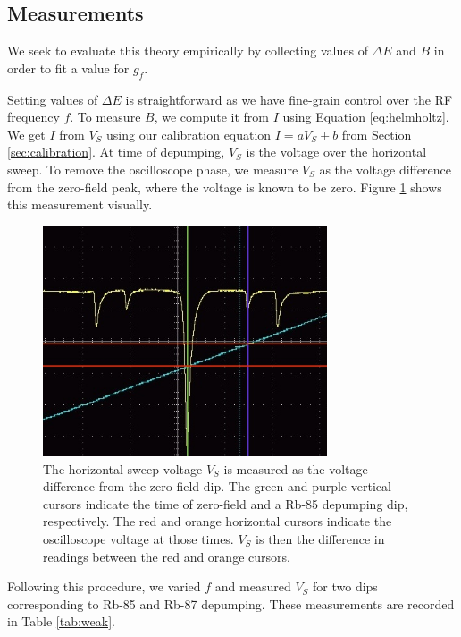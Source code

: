 \documentclass[12pt, letterpaper]{article}
\begin{document}
\subsection{Measurements}

We seek to evaluate this theory empirically by collecting values of $\Delta E$ and $B$ in order to fit a value for $g_f$. 

Setting values of $\Delta E$ is straightforward as we have fine-grain control over the RF frequency $f$. To measure $B$, we compute it from $I$ using Equation \ref{eq:helmholtz}. We get $I$ from $V_S$ using our calibration equation $I = a V_S + b$ from Section \ref{sec:calibration}. At time of depumping, $V_S$ is the voltage over the horizontal sweep. To remove the oscilloscope phase, we measure $V_S$ as the voltage difference from the zero-field peak, where the voltage is known to be zero. Figure \ref{fig:weak-measurement} shows this measurement visually. 

\begin{figure}[!h]
    \centering
    \includegraphics[width=0.75\textwidth]{experiment4/figures/weak_measurement.jpg}
    \caption{The horizontal sweep voltage $V_S$ is measured as the voltage difference from the zero-field dip. The green and purple vertical cursors indicate the time of zero-field and a Rb-85 depumping dip, respectively. The red and orange horizontal cursors indicate the oscilloscope voltage at those times. $V_S$ is then the difference in readings between the red and orange cursors. }
    \label{fig:weak-measurement}
\end{figure}

Following this procedure, we varied $f$ and measured $V_S$ for two dips corresponding to Rb-85 and Rb-87 depumping. These measurements are recorded in Table \ref{tab:weak}. 
\end{document}
